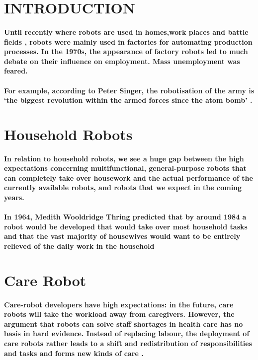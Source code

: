 \documentclass[09pt,a4paper]{article}
\begin{document}
\tableofcontents
\newpage


\section{INTRODUCTION}
\paragraph{Until recently where robots are used in homes,work places and battle fields , robots were mainly used in factories for automating production processes. In the 1970s, the appearance of factory robots led to much debate on their influence on employment. Mass unemployment was feared.}
\paragraph{For example, according to Peter Singer, the robotisation of the army is ‘the biggest revolution within the armed forces since the atom bomb’ \cite{singer2009wired}. }
\section{ Household Robots}
\paragraph{In relation to household robots, we see a huge gap between the high expectations concerning multifunctional, general-purpose robots that can completely take over housework and the actual performance of the currently available robots, and robots that we expect in the coming years.}
\paragraph{In 1964, Medith Wooldridge Thring \cite{thring1984robot} predicted that by around 1984 a robot would be developed that would take over most household tasks and that the vast majority of housewives would want to be entirely relieved of the daily work in the household}
\section{ Care Robot}
\paragraph{ Care-robot developers have high expectations: in the future, care robots will take the workload away from caregivers. However, the argument that robots can solve staff shortages in health care has no basis in hard evidence. Instead of replacing labour, the deployment of care robots rather leads to a shift and redistribution of responsibilities and tasks and forms new kinds of care \cite{oudshoorn2008diagnosis}.}
\end{document}
